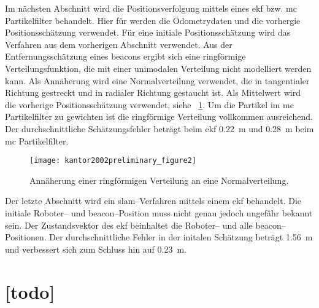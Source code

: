 Im nächsten Abschnitt wird die Positionsverfolgung mittels eines \Gls{ekf} bzw. \Gls{mc} Partikelfilter behandelt. Hier für werden die Odometrydaten und die vorhergie Positionsschätzung verwendet. Für eine initiale Positionsschätzung wird das Verfahren aus dem vorherigen Abschnitt verwendet. Aus der Entfernungsschätzung eines \Glspl{beacon} ergibt sich eine ringförmige Verteilungsfunktion, die mit einer unimodalen Verteilung nicht modelliert werden kann. Als Annäherung wird eine Normalverteilung verwendet, die in tangentialer Richtung gestreckt und in radialer Richtung gestaucht ist. Als Mittelwert wird die vorherige Positionsschätzung verwendet, siehe \figurename~\ref{fig:kantor2002preliminary_figure2}. Um die Partikel im \Gls{mc} Partikelfilter zu gewichten ist die ringförmige Verteilung vollkommen ausreichend. Der durchschnittliche Schätzungsfehler beträgt beim \Gls{ekf} \SI{0.22}{\metre} und \SI{0.28}{\metre} beim \Gls{mc} Partikelfilter.

\begin{figure}[htbp]
	\centering
	\texttt{[image: kantor2002preliminary\_figure2]}
	\caption{Annäherung einer ringförmigen Verteilung an eine Normalverteilung.}
	\label{fig:kantor2002preliminary_figure2}
\end{figure}

Der letzte Abschnitt wird ein \Gls{slam}--Verfahren mittels einem \Gls{ekf} behandelt. Die initiale Roboter-- und \Gls{beacon}--Position muss nicht genau jedoch ungefähr bekannt sein. Der Zustandsvektor des \Gls{ekf} beinhaltet die Roboter-- und alle \Gls{beacon}--Positionen. Der durchschnittliche Fehler in der initalen Schätzung beträgt \SI{1.56}{\metre} und verbessert sich zum Schluss hin auf \SI{0.23}{\metre}.


\begin{comment}
------------------------------------------------------------------------------------------
- Experimental results in range-only localization with radio (82)
\end{comment}
\section{ [todo]}


\begin{comment}
------------------------------------------------------------------------------------------
- Robust range-only beacon localization (264)
- Wie funktioniert die Exploration Strategy?
	- Die Ungünstigeste strategy ist das geradeausfahren mit einem beacon links und rechts.
	- Das Gradientenfeld der abstanddifferenz zwischen den beiden beacons führt einen auf den optimalen weg um die Abstandsdifferenz zu maximieren. (Aktive Exploration)
\end{comment}
